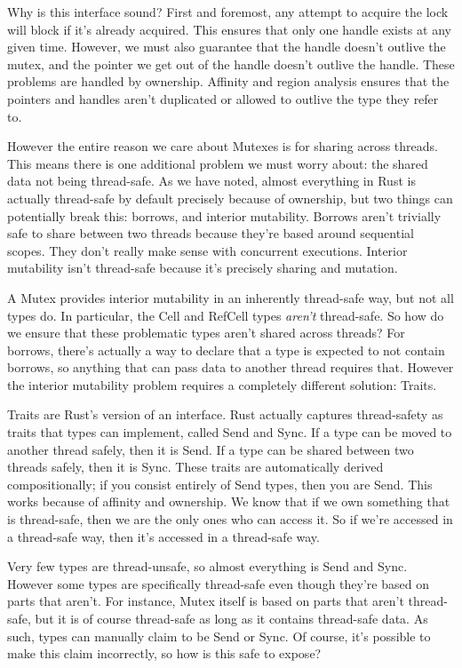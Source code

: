 Why is this interface sound? First and foremost, any attempt to acquire the
lock will block if it's already acquired. This ensures that only one handle
exists at any given time. However, we must also guarantee that the handle doesn't
outlive the mutex, and the pointer we get out of the handle doesn't outlive the
handle. These problems are handled by ownership. Affinity and region analysis
ensures that the pointers and handles aren't duplicated or allowed to outlive
the type they refer to.

However the entire reason we care about Mutexes is for sharing across threads.
This means there is one additional problem we must worry about: the shared
data not being thread-safe. As we have noted, almost everything in Rust is
actually thread-safe by default precisely because of ownership, but two things
can potentially break this: borrows, and interior mutability. Borrows aren't
trivially safe to share between two threads because they're based around
sequential scopes. They don't really make sense with concurrent executions.
Interior mutability isn't thread-safe because it's precisely sharing and mutation.

A Mutex provides interior mutability in an inherently thread-safe way, but not
all types do. In particular, the Cell and RefCell types \emph{aren't} thread-safe.
So how do we ensure that these problematic types aren't shared across threads?
For borrows, there's actually a way to declare that a type is expected to not
contain borrows, so anything that can pass data to another thread requires that.
However the interior mutability problem requires a completely different solution:
Traits.

Traits are Rust's version of an interface. Rust actually captures thread-safety
as traits that types can implement, called Send and Sync. If a type can be moved
to another thread safely, then it is Send. If a type can be shared between two
threads safely, then it is Sync. These traits are automatically derived
compositionally; if you consist entirely of Send types, then you are Send. This
works because of affinity and ownership. We know that if we own something
that is thread-safe, then we are the only ones who can access it. So if we're
accessed in a thread-safe way, then it's accessed in a thread-safe way.

Very few types are thread-unsafe, so almost everything is Send and Sync. However
some types are specifically thread-safe even though they're based on parts that
aren't. For instance, Mutex itself is based on parts that aren't thread-safe, but
it is of course thread-safe as long as it contains thread-safe data. As such,
types can manually claim to be Send or Sync. Of course, it's possible to
make this claim incorrectly, so how is this safe to expose?

